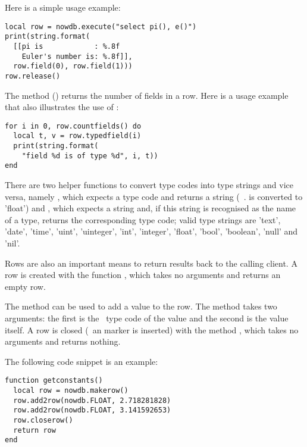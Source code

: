 Here is a simple usage example:

\begin{lua}
\begin{lstlisting}
local row = nowdb.execute("select pi(), e()")
print(string.format(
  [[pi is            : %.8f
    Euler's number is: %.8f]],
  row.field(0), row.field(1)))
row.release()
\end{lstlisting}
\end{lua}

The method () returns
the number of fields in a row.
Here is a usage example that also
illustrates the use of :

\begin{lua}
\begin{lstlisting}
for i in 0, row.countfields() do
  local t, v = row.typedfield(i)
  print(string.format(
    "field %d is of type %d", i, t))
end
\end{lstlisting}
\end{lua}

There are two helper functions to convert
type codes into type strings and vice versa,
namely ,
which expects a type code and returns a string
(\eg\ .  is converted
to 'float') and
, which expects
a string and, if this string is recognised
as the name of a type, returns the corresponding
type code; valid type strings are
'text', 'date', 'time', 'uint', 'uinteger',
'int', 'integer', 'float', 'bool', 'boolean',
'null' and 'nil'.

Rows are also an important means to return 
results back to the calling client.
A row is created with the function
, which takes
no arguments and returns an empty row.

The method  can
be used to add a value to the row.
The method takes two arguments:
the first is the \nowdb\ type code of the value
and the second is the value itself.
A row is closed (\ie\ an  marker
is inserted) with the method
, which takes no arguments
and returns nothing.

The following code snippet is an example:

\begin{lua}
\begin{lstlisting}
function getconstants()
  local row = nowdb.makerow()
  row.add2row(nowdb.FLOAT, 2.718281828)
  row.add2row(nowdb.FLOAT, 3.141592653)
  row.closerow()
  return row
end
\end{lstlisting}
\end{lua}

